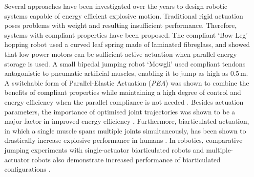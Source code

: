 \documentclass[letterpaper, 10 pt, conference]{ieeeconf}  %
\begin{document}
Several approaches have been investigated over the years to design robotic systems capable of energy efficient explosive motion. Traditional rigid actuation poses problems with weight and resulting insufficient performance. Therefore, systems with compliant properties have been proposed. The compliant `Bow Leg' hopping robot \cite{zeglin1999bow} used a curved leaf spring made of laminated fibreglass, and showed that low power motors can be sufficient active actuation when parallel energy storage is used. A small bipedal jumping robot `Mowgli' \cite{niiyama2007mowgli} used compliant tendons antagonistic to pneumatic artificial muscles, enabling it to jump as high as 0.5\,m. A switchable form of Parallel-Elastic Actuation (\textit{PEA}) was shown to combine the benefits of compliant properties while maintaining a high degree of control and energy efficiency when the parallel compliance is not needed \cite{liu2015spear}. Besides actuation parameters, the importance of optimised joint trajectories was shown to be a major factor in improved energy efficiency \cite{velasco2013soft, babivc2009biarticulated}. Furthermore, biarticulated actuation, in which a single muscle spans multiple joints simultaneously, has been shown to drastically increase explosive performance in humans \cite{schenau1989rotation,prilutsky1994tendon}. In robotics, comparative jumping experiments with single-actuator biarticulated robots and multiple-actuator robots also demonstrate increased performance of biarticulated configurations \cite{oshima2007jumping,babivc2009biarticulated,hyon2002development}.

\end{document}
